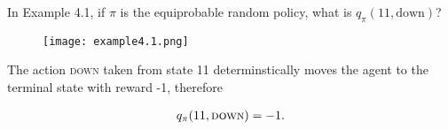 
\begin{exercise}[Exercise 4.1]

In Example 4.1, if $\pi$ is the equiprobable random policy, what is $q_\pi(11,\text{down})$?

\begin{figure}[H]
    \centering
    \texttt{[image: example4.1.png]}
\end{figure}

\end{exercise}


\begin{solution}

The action \textsc{down} taken from state 11 determinstically moves the agent
to the terminal state with reward -1, therefore

\begin{align*}
  q_\pi(11,\textsc{down}) = -1.
\end{align*}

\end{solution}

